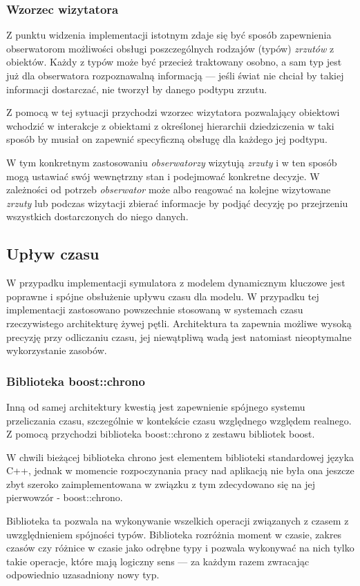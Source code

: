 {{\subsubsection{Wzorzec wizytatora}
\par{
Z punktu widzenia implementacji istotnym zdaje się być sposób zapewnienia obserwatorom możliwości obsługi poszczególnych rodzajów (typów) \textit{zrzutów} z obiektów. Każdy z typów może być przecież traktowany osobno, a sam typ jest już dla obserwatora rozpoznawalną informacją --- jeśli świat nie chciał by takiej informacji dostarczać, nie tworzył by danego podtypu zrzutu.
}
\par{
Z pomocą w tej sytuacji przychodzi wzorzec wizytatora pozwalający obiektowi wchodzić w interakcje z obiektami z określonej hierarchii dziedziczenia w taki sposób by musiał on zapewnić specyficzną obsługę dla każdego jej podtypu.
}
\par{
W tym konkretnym zastosowaniu \textit{obserwatorzy} wizytują \textit{zrzuty} i w ten sposób mogą ustawiać swój wewnętrzny stan i podejmować konkretne decyzje. W zależności od potrzeb \textit{obserwator} może albo reagować na kolejne wizytowane \textit{zrzuty} lub podczas wizytacji zbierać informacje by podjąć decyzję po przejrzeniu wszystkich dostarczonych do niego danych.
}

\subsection{Upływ czasu}
\par{
W przypadku implementacji symulatora z modelem dynamicznym kluczowe jest poprawne i spójne obsłużenie upływu czasu dla modelu. W przypadku tej implementacji zastosowano powszechnie stosowaną w systemach czasu rzeczywistego architekturę żywej pętli. Architektura ta zapewnia możliwe wysoką precyzję przy odliczaniu czasu, jej niewątpliwą wadą jest natomiast nieoptymalne wykorzystanie zasobów.
}
\subsubsection{Biblioteka boost::chrono}
\par{
Inną od samej architektury kwestią jest zapewnienie spójnego systemu przeliczania czasu, szczególnie w kontekście czasu względnego względem realnego. Z pomocą przychodzi biblioteka boost::chrono \cite{Boost} z zestawu bibliotek boost.
\par{
W chwili bieżącej biblioteka chrono jest elementem biblioteki standardowej języka C++, jednak w momencie rozpoczynania pracy nad aplikacją nie była ona jeszcze zbyt szeroko zaimplementowana w związku z tym zdecydowano się na jej pierwowzór - boost::chrono.
}
\par{
Biblioteka ta pozwala na wykonywanie wszelkich operacji związanych z czasem z uwzględnieniem spójności typów. Biblioteka rozróżnia moment w czasie, zakres czasów czy różnice w czasie jako odrębne typy i pozwala wykonywać na nich tylko takie operacje, które mają logiczny sens --- za każdym razem zwracając odpowiednio uzasadniony nowy typ.
}
}}}
